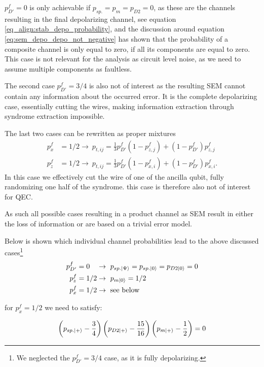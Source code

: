 $p_{D'}^f = 0$ is only achievable  if $p_{sp.}=p_{m}=p_{D2}=0$, as these are the channels resulting in the final depolarizing channel, see equation \eqref{eq_align:stab_depo_probability},
and the discussion around equation \eqref{eq:sem_depo_depo_not_negative} has shown that the probability of a composite channel is only equal to zero, if all its components are equal to zero.
This case is not relevant for the analysis as circuit level noise, as we need to assume multiple components as faultless. 

The second case $p_{D'}^f = 3/4 $ is also not of interest as the resulting SEM cannot contain any information about the occurred error. 
It is the complete depolarizing case, essentially cutting the wires, making information extraction through syndrome extraction impossible. 

The last two cases can be rewritten as  proper mixtures 
\begin{align*}
    p_x^f &= 1/2 \rightarrow \  p_{t,ij} =  \frac{1}{3}p_{D'}^f (1-p_{z,j}^f) + (1-p_{D'}^f) p_{z,j}^f \\
    p_z^f &= 1/2 \rightarrow \  p_{t,ij} =  \frac{1}{3}p_{D'}^f (1-p_{x,i}^f) + (1-p_{D'}^f) p_{x,i}^f.
\end{align*}
In this case we effectively cut the wire of one of the ancilla qubit, fully randomizing one half of the syndrome.
this case is therefore also not of interest for QEC.


As such all possible cases resulting in a product channel as SEM result in either the loss of information or are based on a trivial error model. 

Below is shown which individual channel probabilities lead to the above discussed cases\footnote{We neglected the $p_{D'}^f = 3/4 $ case, as it is fully depolarizing.} 
\begin{align}
    p_{D'}^f &= 0 \ \ \ \rightarrow  \ p_{sp.\ket{\Psi}} =  p_{sp.\ket{0}} = p_{D2\ket{0}} = 0   \\
    p_z^f &= 1/2 \rightarrow \ p_{m\ket{0}} = 1/2 \\
    p_x^f &= 1/2 \rightarrow \ \text{see below} 
\end{align}

for $p_x^f=1/2$ we need to satisfy:

\begin{equation}
    \left(p_{sp.\ket{+}}- \frac{3}{4}\right)
    \left(p_{D2\ket{+}}-\frac{15}{16}\right)
    \left(p_{m\ket{+}}-\frac{1}{2}\right) = 0
\end{equation}


